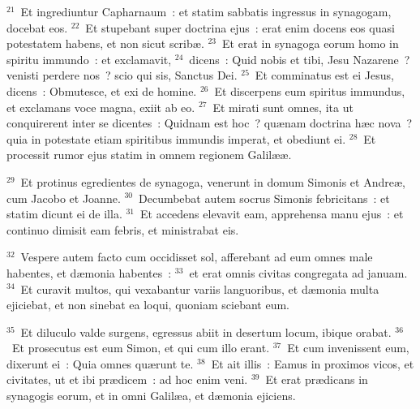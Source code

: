 ${}^{21}$~Et ingrediuntur Capharnaum~: et statim sabbatis ingressus in synagogam, docebat eos.
${}^{22}$~Et stupebant super doctrina ejus~: erat enim docens eos quasi potestatem habens, et non sicut scrib\ae .
${}^{23}$~Et erat in synagoga eorum homo in spiritu immundo~: et exclamavit,
${}^{24}$~dicens~: Quid nobis et tibi, Jesu Nazarene~? venisti perdere nos~? scio qui sis, Sanctus Dei.
${}^{25}$~Et comminatus est ei Jesus, dicens~: Obmutesce, et exi de homine.
${}^{26}$~Et discerpens eum spiritus immundus, et exclamans voce magna, exiit ab eo.
${}^{27}$~Et mirati sunt omnes, ita ut conquirerent inter se dicentes~: Quidnam est hoc~? qu\ae nam doctrina h\ae c nova~? quia in potestate etiam spiritibus immundis imperat, et obediunt ei.
${}^{28}$~Et processit rumor ejus statim in omnem regionem Galil\ae \ae .


${}^{29}$~Et protinus egredientes de synagoga, venerunt in domum Simonis et Andre\ae , cum Jacobo et Joanne.
${}^{30}$~Decumbebat autem socrus Simonis febricitans~: et statim dicunt ei de illa.
${}^{31}$~Et accedens elevavit eam, apprehensa manu ejus~: et continuo dimisit eam febris, et ministrabat eis.


${}^{32}$~Vespere autem facto cum occidisset sol, afferebant ad eum omnes male habentes, et d\ae monia habentes~:
${}^{33}$~et erat omnis civitas congregata ad januam.
${}^{34}$~Et curavit multos, qui vexabantur variis languoribus, et d\ae monia multa ejiciebat, et non sinebat ea loqui, quoniam sciebant eum.


${}^{35}$~Et diluculo valde surgens, egressus abiit in desertum locum, ibique orabat.
${}^{36}$~Et prosecutus est eum Simon, et qui cum illo erant.
${}^{37}$~Et cum invenissent eum, dixerunt ei~: Quia omnes qu\ae runt te.
${}^{38}$~Et ait illis~: Eamus in proximos vicos, et civitates, ut et ibi pr\ae dicem~: ad hoc enim veni.
${}^{39}$~Et erat pr\ae dicans in synagogis eorum, et in omni Galil\ae a, et d\ae monia ejiciens.


